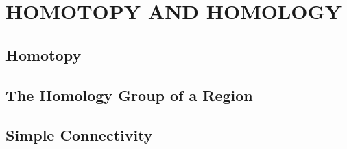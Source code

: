 \section{HOMOTOPY AND HOMOLOGY}
\subsection{Homotopy}
\subsection{The Homology Group of a Region}
\subsection{Simple Connectivity}
